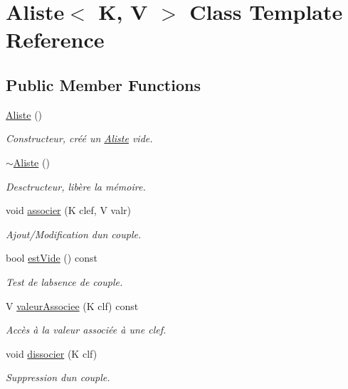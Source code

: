 \hypertarget{class_aliste}{}\section{Aliste$<$ K, V $>$ Class Template Reference}
\label{class_aliste}
\subsection*{Public Member Functions}
\begin{DoxyCompactItemize}
\item 
\hyperlink{class_aliste_ac4c984dbf831565d54e4a820a957591b}{Aliste} ()
\begin{DoxyCompactList}\small\item\em Constructeur, créé un \hyperlink{class_aliste}{Aliste} vide. \end{DoxyCompactList}\item 
\hyperlink{class_aliste_a34faaac7b72f852f88b945551048554b}{$\sim$\+Aliste} ()
\begin{DoxyCompactList}\small\item\em Desctructeur, libère la mémoire. \end{DoxyCompactList}\item 
void \hyperlink{class_aliste_a38f9c7a4bb3e682a4d2ee6df881ad011}{associer} (K clef, V valr)
\begin{DoxyCompactList}\small\item\em Ajout/\+Modification d\textquotesingle{}un couple. \end{DoxyCompactList}\item 
bool \hyperlink{class_aliste_a37d800351e9fb2ec7b4fce0f1d2ef15d}{est\+Vide} () const 
\begin{DoxyCompactList}\small\item\em Test de l\textquotesingle{}absence de couple. \end{DoxyCompactList}\item 
V \hyperlink{class_aliste_a374b265c40c5dd4c72ea3ca6a18a4b92}{valeur\+Associee} (K clf) const 
\begin{DoxyCompactList}\small\item\em Accès à la valeur associée à une clef. \end{DoxyCompactList}\item 
void \hyperlink{class_aliste_a75b73a4cbf593d1fdf62d007ac08904e}{dissocier} (K clf)
\begin{DoxyCompactList}\small\item\em Suppression d\textquotesingle{}un couple. \end{DoxyCompactList}\item 

\end{DoxyCompactItemize}
